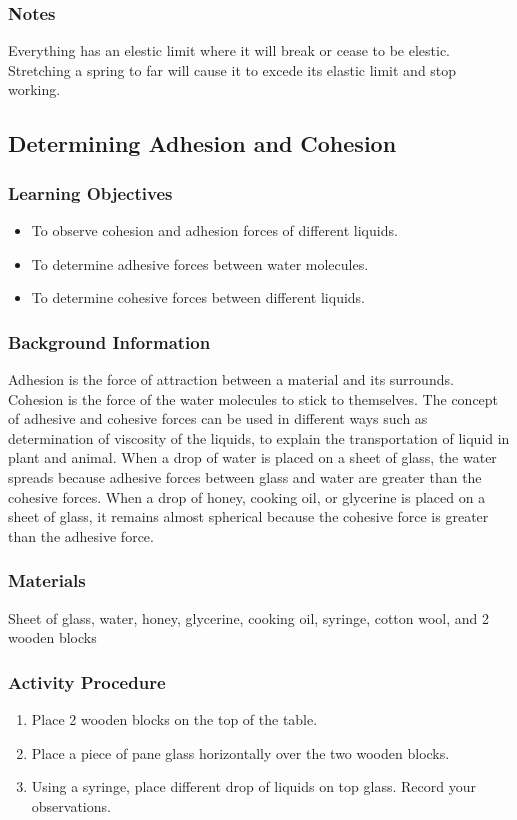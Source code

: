 \subsubsection*{Notes}
Everything has an elestic limit where it will break or cease to be elestic.  Stretching a spring to far will cause it to excede its elastic limit and stop working.

\subsection{Determining Adhesion and Cohesion}

\subsubsection*{Learning Objectives}
\begin{itemize}
\item{To observe cohesion and adhesion forces of different liquids.}
\item{To determine adhesive forces between water molecules.}
\item{To determine cohesive forces between different liquids.}
\end{itemize}

\subsubsection*{Background Information}
Adhesion is the force of attraction between a material and its surrounds.  Cohesion is the force of the water molecules to stick to themselves. The concept of adhesive and cohesive forces can be used in different ways such as determination of  viscosity of the liquids, to explain the transportation of liquid in plant and animal. When a drop of water is placed on a sheet of glass, the water spreads because adhesive forces between glass and water are greater than the cohesive forces. When a drop of honey, cooking oil, or glycerine is placed on a sheet of glass, it remains almost spherical because the cohesive force is greater than the adhesive force.

\subsubsection*{Materials}
Sheet of glass, water, honey, glycerine, cooking oil, syringe, cotton wool, and 2 wooden blocks

\subsubsection*{Activity Procedure}
\begin{enumerate}
\item{Place 2 wooden blocks on the top of the table.}
\item{Place a piece of pane glass horizontally over the two wooden blocks.}
\item{Using a  syringe, place different drop of liquids on top glass. Record your observations.}
\end{enumerate}


